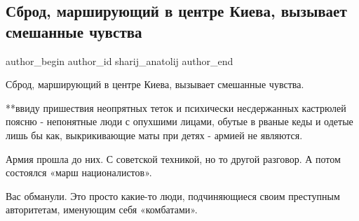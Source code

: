  
 
 
 
 
 
\subsection{Сброд, марширующий в центре Киева, вызывает смешанные чувства}
\label{sec:24_08_2021.fb.sharij_anatolij.1.sbrod_armia_kiev_parad}
 
\ifcmt
 author_begin
   author_id sharij_anatolij
 author_end
\fi

Сброд, марширующий в центре Киева, вызывает смешанные чувства.

**ввиду пришествия неопрятных теток и психически несдержанных кастрюлей поясню
- непонятные люди с опухшими лицами, обутые в рваные кеды и одетые лишь бы как,
выкрикивающие маты при детях - армией не являются. 

Армия прошла до них. С советской техникой, но то другой разговор. А потом
состоялся «марш националистов». 

Вас обманули. Это просто какие-то люди, подчиняющиеся своим преступным
авторитетам, именующим себя «комбатами».


